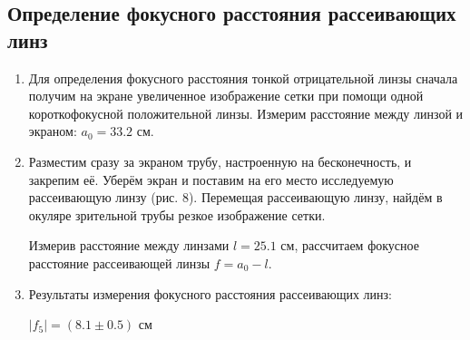 \documentclass[a4paper,12pt]{article} %
\begin{document}
\subsection*{Определение фокусного расстояния рассеивающих линз}
\begin{enumerate}
    \item Для определения фокусного расстояния тонкой отрицательной линзы сначала получим на экране увеличенное изображение сетки при помощи одной короткофокусной положительной линзы. Измерим расстояние между линзой и экраном: $a_0 = 33.2$ см.
    \item Разместим сразу за экраном трубу, настроенную на бесконечность, и закрепим её. Уберём экран и поставим на его место исследуемую рассеивающую линзу (рис. 8). Перемещая рассеивающую линзу, найдём в окуляре зрительной трубы резкое изображение сетки. \par
    Измерив расстояние между линзами $l = 25.1$ см, рассчитаем фокусное расстояние рассеивающей линзы $f = a_0 - l$.
    \item Результаты измерения фокусного расстояния рассеивающих линз:
    \begin{center}
        $|f_5| = (8.1\pm0.5) $ см
    \end{center}
\end{enumerate}
\end{document}
